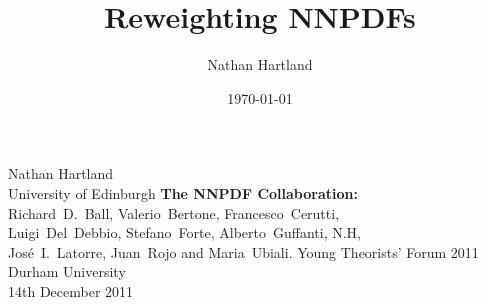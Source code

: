 \documentclass[10pt]{beamer}
\title[]{Reweighting NNPDFs}
\author{Nathan Hartland}
\institute
{
University of Edinburgh\\
\medskip
}
\date{\today}
\begin{document}
\renewcommand{\inserttotalframenumber}{24}


\begin{frame}
\begin{centering}
\vskip20pt
\vskip20pt
Nathan Hartland\\
\small{University of Edinburgh}
\vskip20pt
{\bf The NNPDF Collaboration:}\\
Richard~D.~Ball, Valerio~Bertone, Francesco~Cerutti,\\
Luigi~Del~Debbio, Stefano~Forte, Alberto~Guffanti, N.H,\\
Jos\'e~I.~Latorre, Juan~Rojo and Maria~Ubiali. 
\vskip40pt
Young Theorists' Forum 2011\\
Durham University\\
14th December 2011


\end{centering}

\end{frame}
\end{document}
